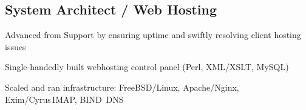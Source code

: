 \documentclass[letter,10pt]{article}
\begin{document}
\subsection{System Architect / Web Hosting}
\begin{zitemize}
        \item Advanced from Support by ensuring uptime and swiftly resolving client hosting issues
        \item Single‑handedly built webhosting control panel (Perl, XML/XSLT, MySQL)
        \item Scaled and ran infrastructure: FreeBSD/Linux, Apache/Nginx, Exim/Cyrus IMAP, BIND DNS
\end{zitemize}
\end{document}
